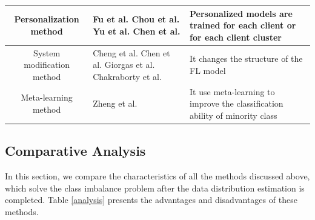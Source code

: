 \documentclass[10pt,journal,compsoc]{IEEEtran}
\begin{document}
\begin{table}[!t]
\begin{tabular}{cp{5.5cm}p{6cm}}
	Personalization method&Fu et al. \cite{fu2021cic} Chou et al. \cite{chou2022grp} Yu et al. \cite{yu2020learning} Chen et al. \cite{chen2022personalized}&Personalized models are trained for each client or for each client cluster\\ \hline
	System modification method& Cheng et al. \cite{cheng2022blockchain} \cite{cheng2022class} Chen et al. \cite{chen2021novel} Giorgas et al. \cite{giorgas2020online} Chakraborty et al.\cite{chakraborty2022improving} &It changes the structure of the FL model \\ \hline
	Meta-learning method&Zheng et al. \cite{zheng2021federated}&It use meta-learning to improve the classification ability of minority class \\ 
	\hline
\end{tabular}
\end{table}
\vspace{-0.2cm}

\subsection{Comparative Analysis}
In this section, we compare the characteristics of all the methods discussed above, which solve the class imbalance problem after the data distribution estimation is completed. Table \ref{analysis} presents the advantages and disadvantages of these methods.
\end{document}
